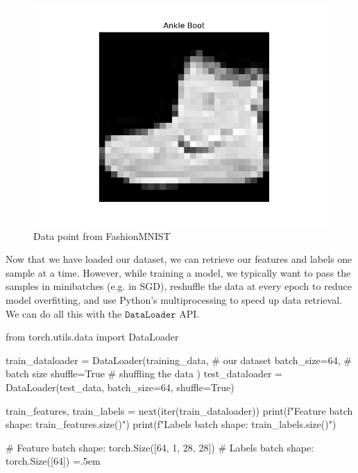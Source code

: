 \documentclass{article}
\newenvironment{cverbatim}
    {\SaveVerbatim{cverb}}
    {\endSaveVerbatim
      \flushleft\fboxrule=0pt\fboxsep=.5em
      \colorbox{cverbbg}{%
        \makebox[\dimexpr\linewidth-2\fboxsep][l]{\BUseVerbatim{cverb}}%
      }
      \endflushleft
  }
\theoremstyle{definition}
\theoremstyle{remark}
\theoremstyle{definition}
\begin{document}
        \begin{figure}
            \centering
            \includegraphics[scale=0.4]{Images/PyTorch/fashion.png}
            \caption{Data point from FashionMNIST}
            \label{fig:fashionmnist_data}
      \end{figure}

      Now that we have loaded our dataset, we can retrieve our features and labels one sample at a time. However, while training a model, we typically want to pass the samples in minibatches (e.g. in SGD), reshuffle the data at every epoch to reduce model overfitting, and use Python's multiprocessing to speed up data retrieval. We can do all this with the $\texttt{DataLoader}$ API. 

      \begin{cverbatim}
        from torch.utils.data import DataLoader

        train_dataloader = DataLoader(training_data,    # our dataset
                                    batch_size=64,    # batch size
                                    shuffle=True      # shuffling the data
                                  )
        test_dataloader = DataLoader(test_data, batch_size=64, shuffle=True)

        train_features, train_labels = next(iter(train_dataloader))
        print(f"Feature batch shape: {train_features.size()}")
        print(f"Labels batch shape: {train_labels.size()}")

        # Feature batch shape: torch.Size([64, 1, 28, 28])
        # Labels batch shape: torch.Size([64])
      \end{cverbatim}
\end{document}
